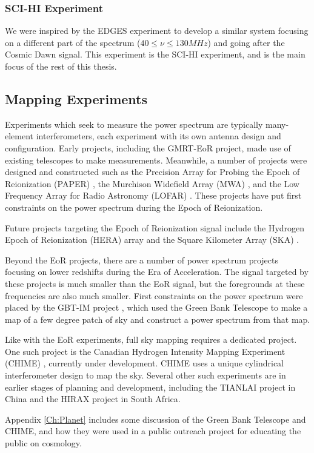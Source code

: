 \subsubsection{SCI-HI Experiment}
We were inspired by the EDGES experiment to develop a similar system focusing on a different part of the \cm spectrum ($40 \leq \nu \leq 130 MHz$) and going after the Cosmic Dawn signal. This experiment is the SCI-HI experiment, and is the main focus of the rest of this thesis.  

\subsection{Mapping Experiments}
Experiments which seek to measure the \cm power spectrum are typically many-element interferometers, each experiment with its own antenna design and configuration. Early projects, including the GMRT-EoR \cite{paciga_2013} project, made use of existing telescopes to make measurements. Meanwhile, a number of projects were designed and constructed such as the Precision Array for Probing the Epoch of Reionization (PAPER) \cite{pober_2013}\cite{jacobs_2014}, the Murchison Widefield Array (MWA) \cite{bernardi_2013}\cite{tingay_2012}, and the Low Frequency Array for Radio Astronomy (LOFAR) \cite{jelic_2014}\cite{lofar}. These projects have put first constraints on the power spectrum during the Epoch of Reionization. 

Future projects targeting the Epoch of Reionization signal include the Hydrogen Epoch of Reionization (HERA) \cite{hera}\cite{bernardi_2014} array and the Square Kilometer Array (SKA) \cite{ska}.

Beyond the EoR projects, there are a number of power spectrum projects focusing on lower redshifts during the Era of Acceleration. The \cm signal targeted by these projects is much smaller than the EoR signal, but the foregrounds at these frequencies are also much smaller. First constraints on the power spectrum were placed by the GBT-IM project \cite{masui_2012}\cite{switzer_2013}, which used the Green Bank Telescope to make a map of a few degree patch of sky and construct a power spectrum from that map. 

Like with the EoR experiments, full sky mapping requires a dedicated project. One such project is the Canadian Hydrogen Intensity Mapping Experiment (CHIME) \cite{shaw_2014}\cite{chime}, currently under development. CHIME uses a unique cylindrical interferometer design to map the sky. Several other such experiments are in earlier stages of planning and development, including the TIANLAI project in China and the HIRAX project in South Africa. 

Appendix \ref{Ch:Planet} includes some discussion of the Green Bank Telescope and CHIME, and how they were used in a public outreach project for educating the public on \cm cosmology. 

